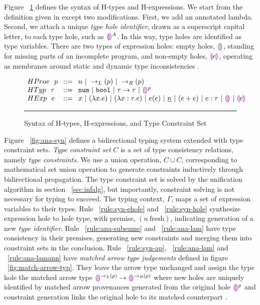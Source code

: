 \label{sec:typinf}
Figure ~\ref{fig:syntax_fig} defines the syntax of H-types and H-expressions. We start from the definition given in \citet{HazelnutPOPL} except two modifications. First, we add an annotated lambda. Second, we attach a unique \emph{type hole identifier}, drawn as a superscript capital letter, to each type hole, such as $\textcolor{violet}{\llparenthesis}\textcolor{violet}{\rrparenthesis}^A$. In this way, type holes are identified as type variables. There are two types of expression holes: empty holes, $\textcolor{violet}{\llparenthesis}\textcolor{violet}{\rrparenthesis}$, standing for missing parts of an incomplete program, and non-empty holes, $\textcolor{violet}{\llparenthesis} e \textcolor{violet}{\rrparenthesis}$, operating as membranes around static and dynamic type inconsistencies \cite{HazelLive}. \par
\begin{figure}[htbp]
\vspace{-3px} 
$\arraycolsep=4pt\begin{array}{lll}
HProv~~ p & ::= & 
    n ~\vert~ 
    \rightarrow_{L}(p) ~\vert~ 
    \rightarrow_{R}(p)
    \\
HTyp~~ \tau & ::= &
  \tnum ~\vert~
  \tbool ~\vert~
  \tarr{\tau}{\tau} ~\vert~
  \ehole^p
  \\
HExp~~ e & ::= &
  x ~\vert~
  \lamfunc{x}{e} ~\vert~
  \lamfunc{x:\tau}{e} ~\vert~
  e(e) ~\vert~
  \underlinenum{n} ~\vert~
  (e+e) ~\vert~
  e: \tau ~\vert~
  \ehole  ~\vert~
  \notehole{e} 
\end{array}$
\hrule
\caption{Syntax of H-types, H-expressions, and Type Constraint Set}
\label{fig:syntax_fig}
\vspace{-5px}
\end{figure}
Figure ~\ref{fig:ana-syn} defines a bidirectional typing system extended with type constraint sets. \emph{Type constraint set} $C$ is a set of type consistency relations, namely \emph{type constraints}. We use a union operation, $C \cup C$, corresponding to mathematical set union operation to generate constraints inductively through bidirectional propagation. The type constraint set is solved by the unification algorithm in section ~\ref{sec:infalg}, but importantly, constraint solving is not necessary for typing to succeed. The typing context, $\Gamma$, maps a set of expression variables to their types. Rule ~\ref{rule:syn-ehole} and ~\ref{rule:syn-hole} synthesize expression hole to hole type, with premise, $(n ~ \text{fresh})$, indicating generation of a new \emph{type identifier}. Rule ~\ref{rule:ana-subsume} and ~\ref{rule:ana-lam} have type consistency in their premises, generating new constraints and merging them into constraint sets in the conclusion. Rule ~\ref{rule:syn-ap}, ~\ref{rule:ana-lam} and ~\ref{rule:ana-lamann} have \emph{matched arrow type judgements} defined in figure ~\ref{fig:match-arrow-typ}. They leave the arrow type unchanged and assign the type hole the matched arrow type $\textcolor{violet}{\llparenthesis}\textcolor{violet}{\rrparenthesis}^{\rightarrow_{L}(p)} \rightarrow \textcolor{violet}{\llparenthesis}\textcolor{violet}{\rrparenthesis}^{\rightarrow_{R}(p)}$ where new holes are uniquely identified by matched arrow provenances generated from the original hole $\textcolor{violet}{\llparenthesis}\textcolor{violet}{\rrparenthesis}^{p}$ and constraint generation links the original hole to its matched counterpart \cite{HazelnutPOPL}.
